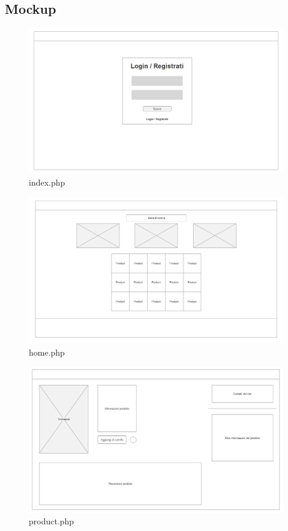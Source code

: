 \documentclass[12pt]{extarticle}
\begin{document}
\subsection{Mockup}
\FloatBarrier
\begin{figure}
    \includegraphics[width=\linewidth]{mocanu/mockup/Index.png}
    \caption{index.php}
    \label{fig:index.php}
\end{figure}
\begin{figure}
    \includegraphics[width=\linewidth]{mocanu/mockup/Home.png}
    \caption{home.php}
    \label{fig:home.php}
\end{figure}
\begin{figure}
    \includegraphics[width=\linewidth]{mocanu/mockup/Product.png}
    \caption{product.php}
    \label{fig:product.php}
\end{figure}
\end{document}

